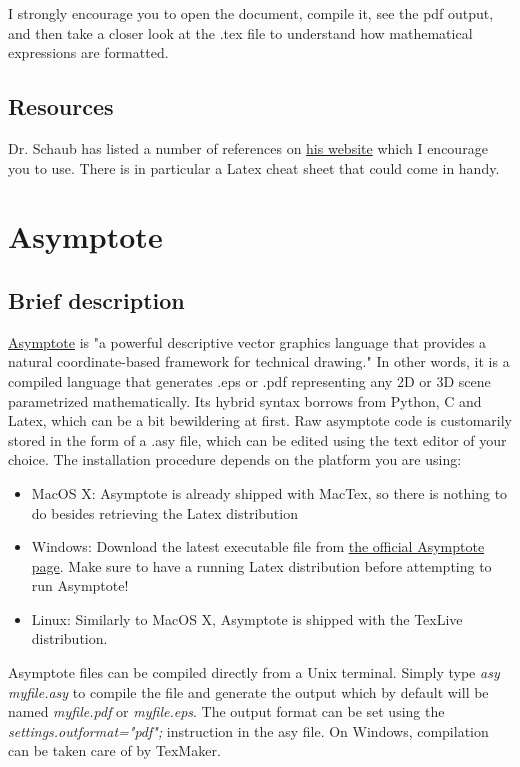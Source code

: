 \documentclass{report}
\begin{document}
I strongly encourage you to open the document, compile it, see the pdf output, and then take a closer look at the .tex file to understand how mathematical expressions are formatted.
\subsection*{Resources}
Dr. Schaub has listed a number of references on \href{http://hanspeterschaub.info/AVS-LaTeX.html}{his website} which I encourage you to use. There is in particular a Latex cheat sheet that could come in handy.  

\section{Asymptote}
\subsection{Brief description}
\href{http://asymptote.sourceforge.net/}{Asymptote} is "a powerful descriptive vector graphics language that provides a natural coordinate-based framework for technical drawing." In other words, it is a compiled language that generates .eps or .pdf representing any 2D or 3D scene parametrized mathematically. Its hybrid syntax borrows from Python, C and Latex, which can be a bit bewildering at first. Raw asymptote code is customarily stored in the form of a .asy file, which can be edited using the text editor of your choice.
The installation procedure depends on the platform you are using:
\begin{itemize}
\item MacOS X: Asymptote is already shipped with MacTex, so there is nothing to do besides retrieving the Latex distribution
\item Windows: Download the latest executable file from \href{https://sourceforge.net/projects/asymptote/files/}{the official Asymptote page}. Make sure to have a running Latex distribution before attempting to run Asymptote!
\item Linux: Similarly to MacOS X, Asymptote is shipped with the TexLive distribution.
\end{itemize} 
Asymptote files can be compiled directly from a Unix terminal. Simply type \textit{asy myfile.asy} to compile the file and generate the output which by default will be named \textit{myfile.pdf} or \textit{myfile.eps}. The output format can be set using the \textit{settings.outformat="pdf";} instruction in the asy file. On Windows, compilation can be taken care of by TexMaker.
\end{document}
